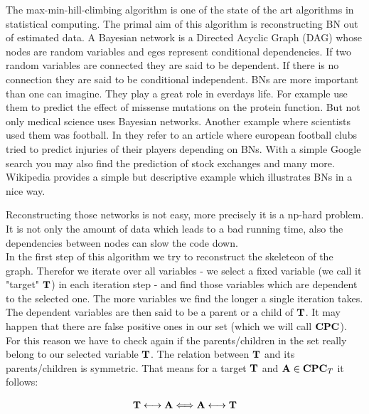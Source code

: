 The max-min-hill-climbing algorithm is one of the state of the art algorithms in statistical computing. The primal aim of this algorithm is reconstructing BN out of estimated data. A Bayesian network is a Directed Acyclic Graph (DAG) whose nodes are random variables and eges represent conditional dependencies. If two random variables are connected they are said to be dependent. If there is no connection they are said to be conditional independent. BNs are more important than one can imagine. They play a great role in everdays life. For example \cite{NBBCW} use them to predict the effect of missense mutations on the protein function. But not only medical science uses Bayesian networks. Another example where scientists used them was football. In \cite{PKA} they refer to an article where european football clubs tried to predict injuries of their players depending on BNs. With a simple Google search you may also find the prediction of stock exchanges and many more. Wikipedia provides a simple but descriptive example which illustrates BNs in a nice way.


Reconstructing those networks is not easy, more precisely it is a np-hard problem. It is not only the amount of data which leads to a bad running time, also the dependencies between nodes can slow the code down.\\
In the first step of this algorithm we try to reconstruct the skeleteon of the graph. Therefor we iterate over all variables - we select a fixed variable (we call it "target" ${\textbf{T}}$) in each iteration step - and find those variables which are dependent to the selected one. The more variables we find the longer a single iteration takes. The dependent variables are then said to be a parent or a child of ${\textbf{T}}$. It may happen that there are false positive ones in our set (which we will call ${\textbf{CPC}}$). For this reason we have to check again if the parents/children in the set really belong to our selected variable ${\textbf{T}}$. The relation between ${\textbf{T}}$ and its parents/children is symmetric. That means for a target ${\textbf{T}}$ and ${\textbf{A}} \in {\textbf{CPC}}_{T}$ it follows:

\begin{equation}
	{\textbf{T}} \longleftrightarrow {\textbf{A}} \Longleftrightarrow {\textbf{A}} \longleftrightarrow {\textbf{T}}
\end{equation}

